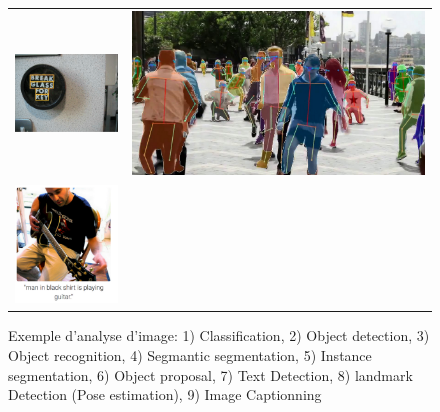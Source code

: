 \begin{figure}
\begin{tabular}{cc}
    \includegraphics[scale=0.4]{./tex/computer-vision/object-recognition/textdetepic.png}&\includegraphics[scale=0.2]{./tex/computer-vision/object-recognition/poseest.png}\\
    \includegraphics[scale=0.4]{./tex/computer-vision/object-recognition/imagecappic.png}
    \end{tabular}
    \caption{Exemple d'analyse d'image: 1) Classification, 2) Object detection, 3) Object recognition, 4) Segmantic segmentation, 5) Instance segmentation, 6) Object proposal, 7) Text Detection, 8) landmark Detection (Pose estimation), 9) Image Captionning}
    \label{classifim}
\end{figure}


